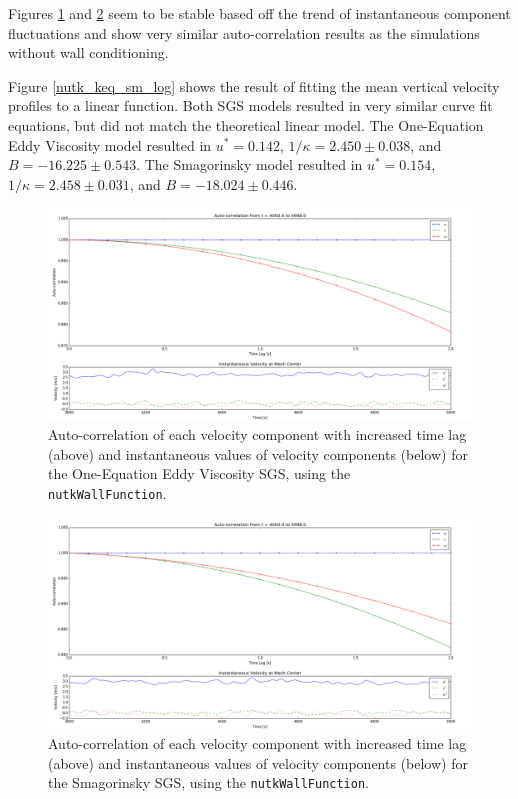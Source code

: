 \documentclass[12pt]{article}
\begin{document}
Figures \ref{nutk_keq_stab} and \ref{nutk_sm_stab} seem to be stable based off the trend of instantaneous component fluctuations and show very similar auto-correlation results as the simulations without wall conditioning. 

Figure \ref{nutk_keq_sm_log} shows the result of fitting the mean vertical velocity profiles to a linear function.  Both SGS models resulted in very similar curve fit equations, but did not match the theoretical linear model.  The One-Equation Eddy Viscosity model resulted in $u^* = 0.142$, $1/\kappa = 2.450 \pm 0.038$, and $B = -16.225 \pm 0.543$.  The Smagorinsky model resulted in $u^* = 0.154$, $1/\kappa = 2.458 \pm 0.031$, and $B = -18.024 \pm 0.446$.

\begin{figure}[H]
\centering
\includegraphics[scale=0.35]{nutk/keq_stability.png}
\caption{Auto-correlation of each velocity component with increased time lag (above) and instantaneous values of velocity components (below) for the One-Equation Eddy Viscosity SGS, using the \texttt{nutkWallFunction}.}
\label{nutk_keq_stab}
\end{figure}
  
\begin{figure}[H]
\centering
\includegraphics[scale=0.35]{nutk/sm_stability.png}
\caption{Auto-correlation of each velocity component with increased time lag (above) and instantaneous values of velocity components (below) for the Smagorinsky SGS, using the \texttt{nutkWallFunction}.}
\label{nutk_sm_stab}
\end{figure}
\end{document}

